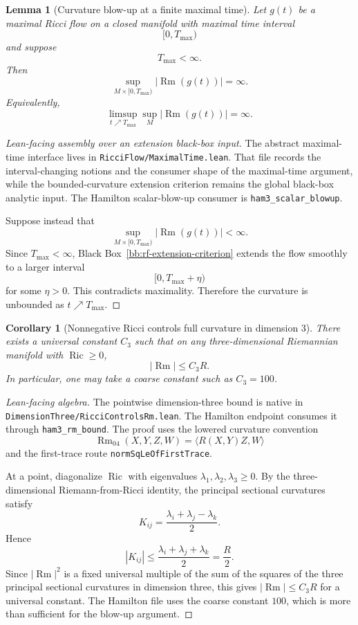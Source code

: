 \documentclass[11pt]{article}
\theoremstyle{plain}
\newtheorem{lemma}[theorem]{Lemma}
\newtheorem{corollary}[theorem]{Corollary}
\theoremstyle{definition}
\theoremstyle{remark}
\newcommand{\Ric}{\operatorname{Ric}}
\newcommand{\Rm}{\operatorname{Rm}}
\newcommand{\abs}[1]{\left|#1\right|}
\newcommand{\norm}[1]{\left|#1\right|}
\newcommand{\leanref}[1]{\nolinkurl{#1}}
\newcommand{\leanfile}[1]{\nolinkurl{#1}}
\newcommand{\rffile}[1]{\leanfile{#1}}
\begin{document}
\begin{lemma}[Curvature blow-up at a finite maximal time]
\label{lem:finite-time-curvature-blow-up}
Let $g(t)$ be a maximal Ricci flow on a closed manifold with maximal time
interval
\[
[0,T_{\max})
\]
and suppose
\[
T_{\max}<\infty.
\]
Then
\[
\sup_{M\times[0,T_{\max})}\norm{\Rm(g(t))}=\infty.
\]
Equivalently,
\[
\limsup_{t\nearrow T_{\max}}\sup_M\norm{\Rm(g(t))}=\infty.
\]
\end{lemma}

\begin{proof}[Lean-facing assembly over an extension black-box input]
The abstract maximal-time interface lives in
\rffile{RicciFlow/MaximalTime.lean}.  That file records the interval-changing
notions and the consumer shape of the maximal-time argument, while the
bounded-curvature extension criterion remains the global black-box analytic
input.  The Hamilton scalar-blow-up consumer is \leanref{ham3_scalar_blowup}.

Suppose instead that
\[
\sup_{M\times[0,T_{\max})}\norm{\Rm(g(t))}<\infty.
\]
Since $T_{\max}<\infty$, Black Box~\ref{bb:rf-extension-criterion} extends the
flow smoothly to a larger interval
\[
[0,T_{\max}+\eta)
\]
for some $\eta>0$.  This contradicts maximality.  Therefore the curvature is
unbounded as \(t\nearrow T_{\max}\).
\end{proof}

\begin{corollary}[Nonnegative Ricci controls full curvature in dimension $3$]
\label{cor:ricci-controls-rm}
There exists a universal constant $C_3$ such that on any three-dimensional
Riemannian manifold with $\Ric\ge0$,
\[
\norm{\Rm}\le C_3R.
\]
In particular, one may take a coarse constant such as $C_3=100$.
\end{corollary}

\begin{proof}[Lean-facing algebra]
The pointwise dimension-three bound is native in
\rffile{DimensionThree/RicciControlsRm.lean}.  The Hamilton endpoint consumes
it through \leanref{ham3_rm_bound}.  The proof uses the lowered curvature
convention
\[
  \Rm_{04}(X,Y,Z,W)=\langle R(X,Y)Z,W\rangle
\]
and the first-trace route \leanref{normSqLeOfFirstTrace}.

At a point, diagonalize \(\Ric\) with eigenvalues
\(\lambda_1,\lambda_2,\lambda_3\ge0\).  By the three-dimensional
Riemann-from-Ricci identity, the principal sectional curvatures satisfy
\[
K_{ij}=\frac{\lambda_i+\lambda_j-\lambda_k}{2}.
\]
Hence
\[
\abs{K_{ij}}\le\frac{\lambda_i+\lambda_j+\lambda_k}{2}=\frac R2.
\]
Since \(\norm{\Rm}^2\) is a fixed universal multiple of the sum of the squares
of the three principal sectional curvatures in dimension three, this gives
\(\norm{\Rm}\le C_3R\) for a universal constant.  The Hamilton file uses the
coarse constant \(100\), which is more than sufficient for the blow-up
argument.
\end{proof}
\end{document}
